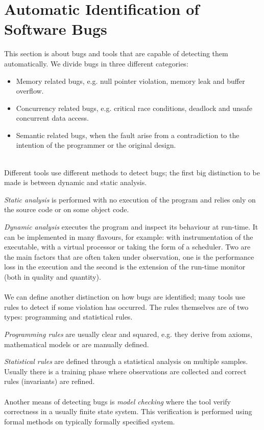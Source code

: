 
\section{Automatic Identification of Software Bugs}
This section is about bugs and tools that are capable of detecting them automatically. We divide bugs in three different categories:
\begin{itemize}
    \item Memory related bugs, e.g. null pointer violation, memory leak and buffer overflow.
    \item Concurrency related bugs, e.g. critical race conditions, deadlock and unsafe concurrent data access.
    \item Semantic related bugs, when the fault arise from a contradiction to the intention of the programmer or the original design.
\end{itemize}
\\
Different tools use different methods to detect bugs; the first big distinction to be made is between dynamic and static analysis.

\emph{Static analysis} is performed with no execution of the program and relies only on the source code or on some object code. 

\emph{Dynamic analysis} executes the program and inspect its behaviour at run-time. It can be implemented in many flavours, for example: with instrumentation of the executable, with a virtual processor or taking the form of a scheduler. Two are the main factors that are often taken under observation, one is the performance loss in the execution and the second is the extension of the run-time monitor (both in quality and quantity).
\\
\\
We can define another distinction on how bugs are identified; many tools use rules to detect if some violation has occurred. The rules themselves are of two types: programming and statistical rules.

\emph{Programming rules} are usually clear and squared, e.g. they derive from axioms, mathematical models or are manually defined.

\emph{Statistical rules} are defined through a statistical analysis on multiple samples. Usually there is a training phase where observations are collected and correct rules (invariants) are refined.
\\
\\
Another means of detecting bugs is \emph{model checking} where the tool verify correctness in a usually finite state system. This verification is performed using formal methods on typically formally specified system. 

